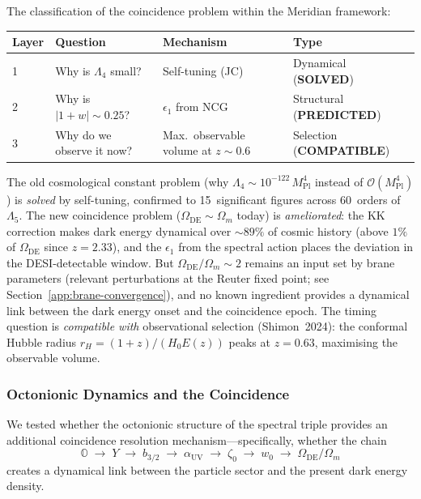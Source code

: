 The classification of the coincidence problem within the Meridian framework:

\begin{center}
\begin{tabular}{l l l l}
\hline
Layer & Question & Mechanism & Type \\
\hline
1 & Why is $\Lambda_4$ small? & Self-tuning (JC) & Dynamical (\textbf{SOLVED}) \\
2 & Why is $|1+w| \sim 0.25$? & $\epsilon_1$ from NCG & Structural (\textbf{PREDICTED}) \\
3 & Why do we observe it now? & Max.\ observable volume at $z \sim 0.6$ & Selection (\textbf{COMPATIBLE}) \\
\hline
\end{tabular}
\end{center}

\noindent
The old cosmological constant problem (why $\Lambda_4 \sim 10^{-122}\,M_{\mathrm{Pl}}^4$ instead of $\mathcal{O}(M_{\mathrm{Pl}}^4)$) is \emph{solved} by self-tuning, confirmed to 15~significant figures across 60~orders of $\Lambda_5$. The new coincidence problem ($\Omega_{\mathrm{DE}} \sim \Omega_m$ today) is \emph{ameliorated}: the KK correction makes dark energy dynamical over ${\sim}89\%$ of cosmic history (above $1\%$ of $\Omega_{\mathrm{DE}}$ since $z = 2.33$), and the $\epsilon_1$ from the spectral action places the deviation in the DESI-detectable window. But $\Omega_{\mathrm{DE}}/\Omega_m \sim 2$ remains an input set by brane parameters (relevant perturbations at the Reuter fixed point; see Section~\ref{app:brane-convergence}), and no known ingredient provides a dynamical link between the dark energy onset and the coincidence epoch. The timing question is \emph{compatible with} observational selection (Shimon~2024): the conformal Hubble radius $r_H = (1+z)/(H_0 E(z))$ peaks at $z = 0.63$, maximising the observable volume.

\subsubsection{Octonionic Dynamics and the Coincidence}

We tested whether the octonionic structure of the spectral triple provides an additional coincidence resolution mechanism---specifically, whether the chain
\[
  \mathbb{O} \;\to\; Y \;\to\; b_{3/2} \;\to\; \alpha_{\mathrm{UV}} \;\to\; \zeta_0 \;\to\; w_0 \;\to\; \Omega_{\mathrm{DE}}/\Omega_m
\]
creates a dynamical link between the particle sector and the present dark energy density.


